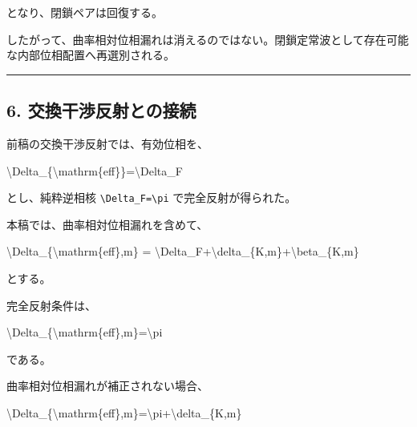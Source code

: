 \documentclass[
  a4paper,
]{article}
\newenvironment{Shaded}{}{}
\newcommand{\NormalTok}[1]{#1}
\begin{document}
となり、閉鎖ペアは回復する。

したがって、曲率相対位相漏れは消えるのではない。閉鎖定常波として存在可能な内部位相配置へ再選別される。

\begin{center}\rule{0.5\linewidth}{0.5pt}\end{center}

\subsection{6.
交換干渉反射との接続}\label{ux4ea4ux63dbux5e72ux6e09ux53cdux5c04ux3068ux306eux63a5ux7d9a}

前稿の交換干渉反射では、有効位相を、

\begin{Shaded}
\begin{Highlighting}[]
\NormalTok{\textbackslash{}Delta\_\{\textbackslash{}mathrm\{eff\}\}=\textbackslash{}Delta\_F}
\end{Highlighting}
\end{Shaded}

とし、純粋逆相核 \texttt{\textbackslash{}Delta\_F=\textbackslash{}pi}
で完全反射が得られた。

本稿では、曲率相対位相漏れを含めて、

\begin{Shaded}
\begin{Highlighting}[]
\NormalTok{\textbackslash{}Delta\_\{\textbackslash{}mathrm\{eff\},m\}}
\NormalTok{=}
\NormalTok{\textbackslash{}Delta\_F+\textbackslash{}delta\_\{K,m\}+\textbackslash{}beta\_\{K,m\}}
\end{Highlighting}
\end{Shaded}

とする。

完全反射条件は、

\begin{Shaded}
\begin{Highlighting}[]
\NormalTok{\textbackslash{}Delta\_\{\textbackslash{}mathrm\{eff\},m\}=\textbackslash{}pi}
\end{Highlighting}
\end{Shaded}

である。

曲率相対位相漏れが補正されない場合、

\begin{Shaded}
\begin{Highlighting}[]
\NormalTok{\textbackslash{}Delta\_\{\textbackslash{}mathrm\{eff\},m\}=\textbackslash{}pi+\textbackslash{}delta\_\{K,m\}}
\end{Highlighting}
\end{Shaded}
\end{document}
